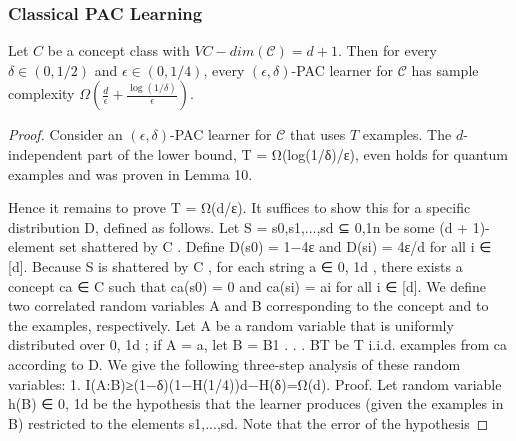 \documentclass[main.tex]{subfiles}
\begin{document}
\subsubsection{Classical PAC Learning}

\begin{theorem}
Let $C$ be a concept class with $VC-dim(\mathcal{C}) = d + 1$. Then for every $\delta \in (0,1/2)$ and $\epsilon \in (0,1/4)$, every $(\epsilon,\delta)$-PAC learner for $\mathcal{C}$ has sample complexity $\Omega(\frac{d}{\epsilon} + \frac{\log(1/\delta)}{\epsilon})$.
\end{theorem}

\begin{proof} 
Consider an $(\epsilon,\delta)$-PAC learner for $\mathcal{C}$ that uses $T$ examples. The $d$-independent part of the lower bound, T = Ω(log(1/δ)/ε), even holds for quantum examples and was proven in Lemma 10. 

Hence it remains to prove T = Ω(d/ε). It suffices to show this for a specific distribution D, defined as follows. Let S = {s0,s1,...,sd} ⊆ {0,1}n be some (d + 1)-element set shattered by C . Define D(s0) = 1−4ε and D(si) = 4ε/d for all i ∈ [d].
Because S is shattered by C , for each string a ∈ {0, 1}d , there exists a concept ca ∈ C such that ca(s0) = 0 and ca(si) = ai for all i ∈ [d]. We define two correlated random variables A and B corresponding to the concept and to the examples, respectively. Let A be a random variable that is uniformly distributed over {0, 1}d ; if A = a, let B = B1 . . . BT be T i.i.d. examples from ca according to D. We give the following three-step analysis of these random variables:
1. I(A:B)≥(1−δ)(1−H(1/4))d−H(δ)=Ω(d).
Proof. Let random variable h(B) ∈ {0, 1}d be the hypothesis that the learner produces (given
the examples in B) restricted to the elements s1,...,sd. Note that the error of the hypothesis
\end{proof}
\end{document}
